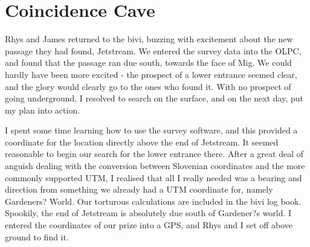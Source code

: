 \section{Coincidence Cave}
    \begin{marginfigure}
    \end{marginfigure}


    Rhys and James returned to the bivi, buzzing with excitement about the new passage they had found, Jetstream. We entered the survey data into the OLPC, and found that the passage ran due south, towards the face of Mig. We could hardly have been more excited - the prospect of a lower entrance seemed clear, and the glory would clearly go to the ones who found it. With no prospect of going underground, I resolved to search on the surface, and on the next day, put my plan into action.

    I spent some time learning how to use the survey software, and this provided a coordinate for the location directly above the end of Jetstream. It seemed reasonable to begin our search for the lower entrance there. After a great deal of anguish dealing with the conversion between Slovenian coordinates and the more commonly supported UTM, I realised that all I really needed was a bearing and direction from something we already had a UTM coordinate for, namely Gardeners? World. Our torturous calculations are included in the bivi log book. Spookily, the end of Jetstream is absolutely due south of Gardener?s world. I entered the coordinates of our prize into a GPS, and Rhys and I set off above ground to find it.

